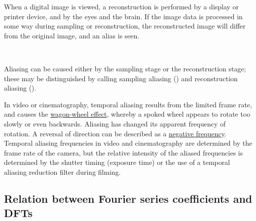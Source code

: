 \documentclass{article}
\newcommand{\tmtextit}[1]{\text{{\itshape{#1}}}}
\begin{document}
When a digital image is viewed, a reconstruction is performed by a display or
printer device, and by the eyes and the brain. If the image data is processed
in some way during sampling or reconstruction, the reconstructed image will
differ from the original image, and an alias is seen.

\

Aliasing can be caused either by the sampling stage or the reconstruction
stage; these may be distinguished by calling sampling aliasing
(\tmtextit{prealiasing}) and reconstruction aliasing
(\tmtextit{postaliasing}).

In video or cinematography, temporal aliasing results from the limited frame
rate, and causes the
\href{https://en.wikipedia.org/wiki/Wagon-wheel\_effect}{wagon-wheel effect},
whereby a spoked wheel appears to rotate too slowly or even backwards.
Aliasing has changed its apparent frequency of rotation. A reversal of
direction can be described as a
\href{https://en.wikipedia.org/wiki/Negative\_frequency}{negative frequency}.
Temporal aliasing frequencies in video and cinematography are determined by
the frame rate of the camera, but the relative intensity of the aliased
frequencies is determined by the shutter timing (exposure time) or the use of
a temporal aliasing reduction filter during filming.

\subsection{Relation between Fourier series coefficients and DFTs}
\end{document}
